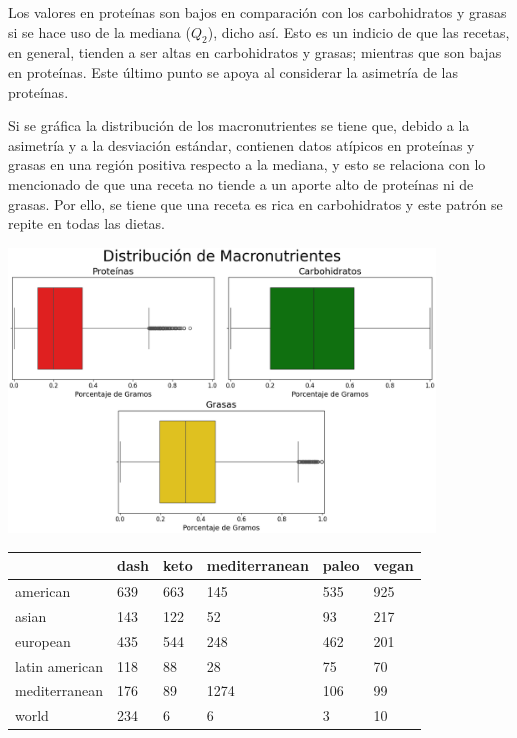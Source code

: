 \documentclass[12pt,a4paper]{article}
\begin{document}
{{            Los valores en proteínas son bajos en comparación 
            con los carbohidratos y grasas si se hace uso de la mediana ($Q_2$), 
            dicho así. Esto es un indicio de que las recetas, en general, 
            tienden a ser altas en carbohidratos y grasas; mientras que son bajas 
            en proteínas. Este último punto se apoya al considerar la asimetría de 
            las proteínas.\newline 

            Si se gráfica la distribución de los macronutrientes se tiene que, debido 
            a la asimetría y a la desviación estándar, contienen datos atípicos en proteínas 
            y grasas en una región positiva respecto a la mediana, y esto se relaciona con 
            lo mencionado de que una receta no tiende a un aporte alto de proteínas ni de grasas. 
            Por ello, se tiene que una receta es rica en carbohidratos y este patrón se 
            repite en todas las dietas.

            \begin{center}
                \includegraphics[width=0.85\textwidth]{Resources/EDA/VisionGeneral_1.png}

                \begin{xtabular}{w{l}{}|w{r}{} w{r}{} w{r}{} w{r}{} w{r}{}}
                \toprule
                    & dash & keto & mediterranean & paleo & vegan \\
                \midrule
                    american & 639 & 663 & 145 & 535 & 925 \\
                    asian & 143 & 122 & 52 & 93 & 217 \\
                    european & 435 & 544 & 248 & 462 & 201 \\
                    latin american & 118 & 88 & 28 & 75 & 70 \\
                    mediterranean & 176 & 89 & 1274 & 106 & 99 \\
                    world & 234 & 6 & 6 & 3 & 10 \\
                \bottomrule
                \end{xtabular}
            \end{center}

}}
\end{document}

